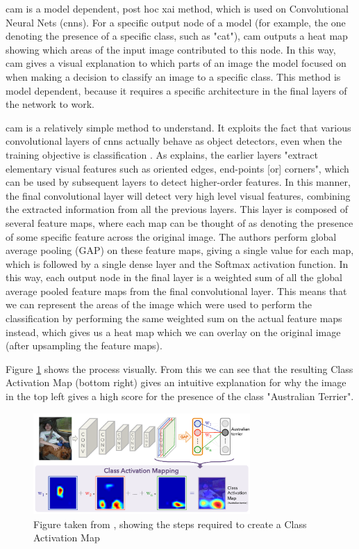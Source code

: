\documentclass[UKenglish]{uiomasterthesis} %
\theoremstyle{definition}
\begin{document}
\ac{cam} \cite{cam} is a model dependent, post hoc \ac{xai} method, which is used on Convolutional Neural Nets (\ac{cnn}s). For a specific output node of a model (for example, the one denoting the presence of a specific class, such as "cat"), \ac{cam} outputs a heat map showing which areas of the input image contributed to this node. In this way, \ac{cam} gives a visual explanation to which parts of an image the model focused on when making a decision to classify an image to a specific class. This method is model dependent, because it requires a specific architecture in the final layers of the network to work.

\ac{cam} is a relatively simple method to understand. It exploits the fact that various convolutional layers of \ac{cnn}s actually behave as object detectors, even when the training objective is classification \cite{cam}. As \cite{lenet5} explains, the earlier layers "extract elementary visual features such as oriented edges, end-points [or] corners", which can be used by subsequent layers to detect higher-order features. In this manner, the final convolutional layer will detect very high level visual features, combining the extracted information from all the previous layers. This layer is composed of several feature maps, where each map can be thought of as denoting the presence of some specific feature across the original image. The authors perform global average pooling (GAP) on these feature maps, giving a single value for each map, which is followed by a single dense layer and the Softmax activation function. In this way, each output node in the final layer is a weighted sum of all the global average pooled feature maps from the final convolutional layer. This means that we can represent the areas of the image which were used to perform the classification by performing the same weighted sum on the actual feature maps instead, which gives us a heat map which we can overlay on the original image (after upsampling the feature maps).

Figure \ref{camimg} shows the process visually. From this we can see that the resulting Class Activation Map (bottom right) gives an intuitive explanation for why the image in the top left gives a high score for the presence of the class "Australian Terrier".

\begin{figure}[h]
\centerline{\includegraphics[width=3.25in]{figure/cam.pdf}}
\caption{Figure taken from \cite{cam}, showing the steps required to create a Class Activation Map}
\label{camimg}
\end{figure}
\end{document}
